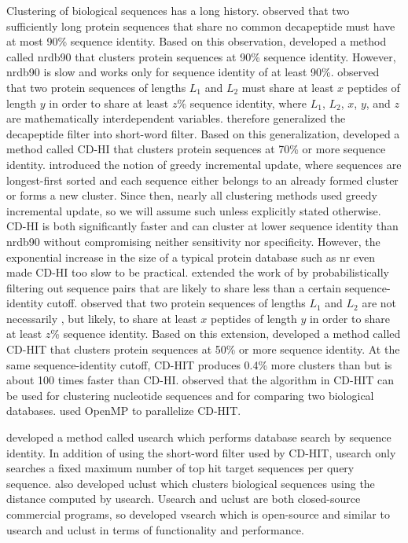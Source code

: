 \documentclass[]{article}
\begin{document}
Clustering of biological sequences has a long history.
 observed that two sufficiently long protein sequences that share no common decapeptide must have at most 90\% sequence identity.
Based on this observation, \citet{holm1998removing} developed a method called nrdb90 that clusters protein sequences at 90\% sequence identity.
However, nrdb90 is slow and works only for sequence identity of at least 90\%.
 observed that two protein sequences of lengths \(L_1\) and \(L_2\) must share at least \(x\) peptides of length \(y\) in order to share at least \(z\)\% sequence identity, 
	where \(L_1\), \(L_2\), \(x\), \(y\), and \(z\) are mathematically interdependent variables.
 therefore generalized the decapeptide filter into short-word filter.
Based on this generalization, \cite{li2001clustering} developed a method called CD-HI that clusters protein sequences at 70\% or more sequence identity.
 introduced the notion of greedy incremental update, where sequences are longest-first sorted and each sequence either belongs to an already formed cluster or forms a new cluster. 
Since then, nearly all clustering methods used greedy incremental update, so we will assume such unless explicitly stated otherwise.
CD-HI is both significantly faster and can cluster at lower sequence identity than nrdb90 without compromising neither sensitivity nor specificity.
However, the exponential increase in the size of a typical protein database such as nr even made CD-HI too slow to be practical.
 extended the work of \citet{li2001clustering} by probabilistically filtering out sequence pairs that are likely to share less than a certain sequence-identity cutoff.
 observed that two protein sequences of lengths \(L_1\) and \(L_2\) are not necessarily , but likely, to share at least \(x\) peptides of length \(y\) in order to share at least \(z\)\% sequence identity.
Based on this extension, \citet{li2002tolerating} developed a method called CD-HIT that clusters protein sequences at 50\% or more sequence identity. 
At the same sequence-identity cutoff, CD-HIT produces 0.4\% more clusters than but is about 100 times faster than CD-HI.
 observed that the algorithm in CD-HIT can be used for clustering nucleotide sequences and for comparing two biological databases.
 used OpenMP to parallelize CD-HIT.

 developed a method called usearch which performs database search by sequence identity. 
In addition of using the short-word filter used by CD-HIT, usearch only searches a fixed maximum number of top hit target sequences per query sequence.  
 also developed uclust which clusters biological sequences using the distance computed by usearch.
Usearch and uclust are both closed-source commercial programs, so \citet{rognes2016vsearch} developed vsearch which is open-source and similar to usearch and uclust in terms of functionality and performance.
\end{document}
